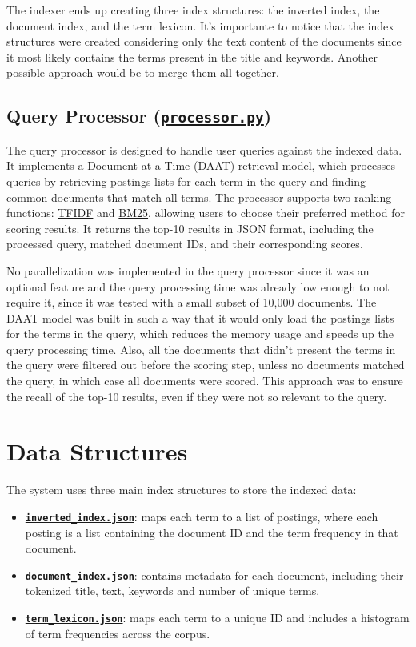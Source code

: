 The indexer ends up creating three index structures: the inverted index, the document index, and the term lexicon. It's importante to notice that the index structures were created considering only the text content of the documents since it most likely contains the terms present in the title and keywords. Another possible approach would be to merge them all together.

\subsection{Query Processor (\hyperref[subsec:query-processing]{\texttt{processor.py}})} \label{subsec:processor}

The query processor is designed to handle user queries against the indexed data. It implements a Document-at-a-Time (DAAT) retrieval model, which processes queries by retrieving postings lists for each term in the query and finding common documents that match all terms. The processor supports two ranking functions: \hyperref[eq:tfidf]{TFIDF} and \hyperref[eq:bm25]{BM25}, allowing users to choose their preferred method for scoring results. It returns the top-10 results in JSON format, including the processed query, matched document IDs, and their corresponding scores.

No parallelization was implemented in the query processor since it was an optional feature and the query processing time was already low enough to not require it, since it was tested with a small subset of 10,000 documents. The DAAT model was built in such a way that it would only load the postings lists for the terms in the query, which reduces the memory usage and speeds up the query processing time. Also, all the documents that didn't present the terms in the query were filtered out before the scoring step, unless no documents matched the query, in which case all documents were scored. This approach was to ensure the recall of the top-10 results, even if they were not so relevant to the query.

\section{Data Structures} \label{sec:data-structures}

The system uses three main index structures to store the indexed data:

\begin{itemize}
  \item \hyperref[subsec:ii]{\textbf{\texttt{inverted\_index.json}}}: maps each term to a list of postings, where each posting is a list containing the document ID and the term frequency in that document.
  \item \hyperref[subsec:di]{\textbf{\texttt{document\_index.json}}}: contains metadata for each document, including their tokenized title, text, keywords and number of unique terms.
  \item \hyperref[subsec:tl]{\textbf{\texttt{term\_lexicon.json}}}: maps each term to a unique ID and includes a histogram of term frequencies across the corpus.
\end{itemize}

